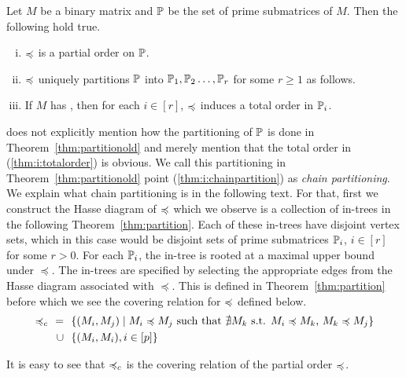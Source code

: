 \begin{theorem}  %
  \label{thm:partitionold} %
  Let $M$ be a binary matrix and $\mathbb P$ be the set of prime submatrices
  of $M$. Then the following hold true.
  \parindent {}
  \begin{enumerate}[i. ]
  \item $\preccurlyeq$ is a partial order on $\mathbb P$.
  \item \label{thm:i:chainpartition} $\preccurlyeq$ uniquely partitions $\mathbb P$ into $\mathbb P_1, \mathbb P_2
    \ldots ,\mathbb P_r$ for some $r \ge 1$ as follows. 
  \item \label{thm:i:totalorder} If $M$ has \COP, then for each $i \in
    [r]$, $\preccurlyeq$ induces a total order in $\mathbb P_i$.
  \end{enumerate}
\end{theorem}

\cite{nsnrs09} does not explicitly mention how the partitioning of
$\mathbb P$ is done in Theorem~\ref{thm:partitionold} and merely mention
that the total order in (\ref{thm:i:totalorder}) is obvious. We call
this partitioning in Theorem~\ref{thm:partitionold} point
(\ref{thm:i:chainpartition}) as {\em chain partitioning}. We explain
what chain partitioning is in the following text. For that, first we
construct the Hasse diagram of $\preccurlyeq$ which we observe is a
collection of in-trees in the following Theorem~\ref{thm:partition}.
Each of these in-trees have disjoint vertex sets,
which in this case would be disjoint sets of prime submatrices
$\mathbb P_i$, $i \in [r]$ for some $r > 0$.  For each $\mathbb P_i$, the in-tree
is rooted at a maximal upper bound under $\preccurlyeq$.  The in-trees
are specified by selecting the appropriate edges from the Hasse
diagram associated with $\preccurlyeq$. This is defined in
Theorem~\ref{thm:partition} before which we see the covering relation
for $\preccurlyeq$ defined below.
\begin{align*}
  \primeless_c \ \  = \ \ &\{ (M_i,M_j) \mid M_i \primeless M_j \text{ \stt\ } \nexists
  M_k \text{ s.t. } M_i \primeless M_k \text{, } M_k \primeless M_j \} \\
  \cup \ \ &\{ (M_i,M_i), i \in [p] \}
\end{align*}

It is easy to see that $\preccurlyeq_c$ is the covering relation of the partial
order $\preccurlyeq$.




